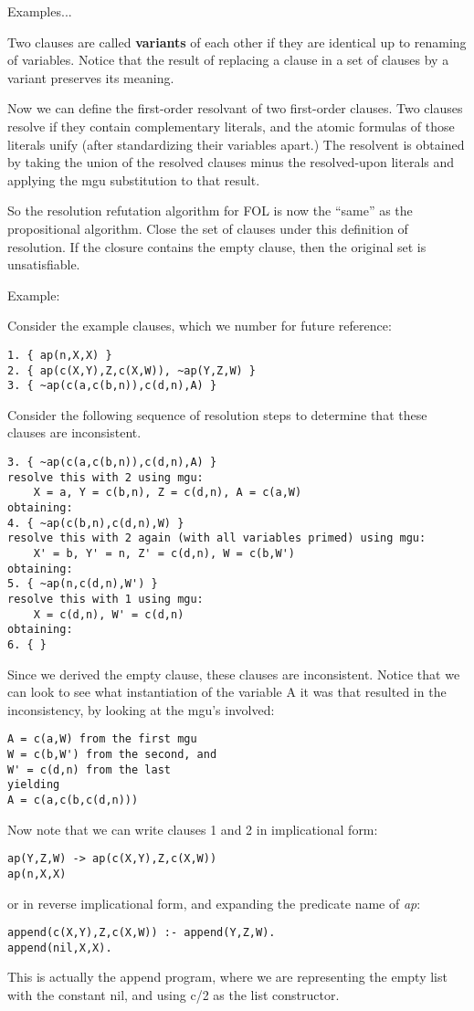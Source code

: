 Examples...

Two clauses are called {\bf variants} of each other if they are
identical up to renaming of variables.  Notice that the result of
replacing a clause in a set of clauses by a variant preserves its
meaning.  

Now we can define the first-order resolvant of two first-order
clauses.  Two clauses resolve if they contain complementary literals,
and the atomic formulas of those literals unify (after standardizing
their variables apart.)  The resolvent is obtained by taking the union
of the resolved clauses minus the resolved-upon literals and applying
the mgu substitution to that result.


So the resolution refutation algorithm for FOL is now the ``same'' as
the propositional algorithm.  Close the set of clauses under this
definition of resolution.  If the closure contains the empty clause,
then the original set is unsatisfiable.

Example:

Consider the example clauses, which we number for future reference:
\begin{verbatim}
1. { ap(n,X,X) }
2. { ap(c(X,Y),Z,c(X,W)), ~ap(Y,Z,W) }
3. { ~ap(c(a,c(b,n)),c(d,n),A) }
\end{verbatim}

Consider the following sequence of resolution steps to determine that
these clauses are inconsistent.
\begin{verbatim}
3. { ~ap(c(a,c(b,n)),c(d,n),A) }
resolve this with 2 using mgu:
    X = a, Y = c(b,n), Z = c(d,n), A = c(a,W)
obtaining:
4. { ~ap(c(b,n),c(d,n),W) }
resolve this with 2 again (with all variables primed) using mgu:
    X' = b, Y' = n, Z' = c(d,n), W = c(b,W')
obtaining:
5. { ~ap(n,c(d,n),W') }
resolve this with 1 using mgu:
    X = c(d,n), W' = c(d,n)
obtaining:
6. { }
\end{verbatim}

Since we derived the empty clause, these clauses are inconsistent.
Notice that we can look to see what instantiation of the variable A it
was that resulted in the inconsistency, by looking at the mgu's
involved:
\begin{verbatim}
A = c(a,W) from the first mgu
W = c(b,W') from the second, and
W' = c(d,n) from the last
yielding
A = c(a,c(b,c(d,n)))
\end{verbatim}
Now note that we can write clauses 1 and 2 in implicational form:
\begin{verbatim}
ap(Y,Z,W) -> ap(c(X,Y),Z,c(X,W))
ap(n,X,X)
\end{verbatim}
or in reverse implicational form, and expanding the predicate name of
{\em ap}:
\begin{verbatim}
append(c(X,Y),Z,c(X,W)) :- append(Y,Z,W).
append(nil,X,X).
\end{verbatim}
This is actually the append program, where we are representing the empty 
list with the constant nil, and using c/2 as the list constructor.

